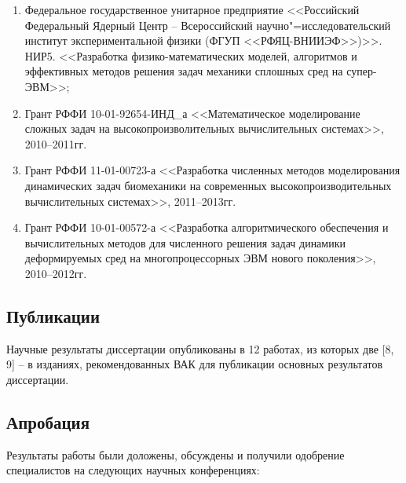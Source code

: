 \begin{enumerate}

\item Федеральное государственное унитарное предприятие <<Российский Федеральный Ядерный Центр -- Всероссийский научно"=исследовательский институт экспериментальной физики (ФГУП <<РФЯЦ-ВНИИЭФ>>)>>. НИР5. <<Разработка физико-математических моделей, алгоритмов и эффективных методов решения задач механики сплошных сред на супер-ЭВМ>>;

\item Грант РФФИ 10-01-92654-ИНД\_а <<Математическое моделирование сложных задач на высокопроизволительных вычислительных системах>>, 2010--2011гг.

\item Грант РФФИ 11-01-00723-а <<Разработка численных методов моделирования динамических задач биомеханики на современных высокопроизводительных вычислительных системах>>, 2011--2013гг.

\item Грант РФФИ 10-01-00572-а <<Разработка алгоритмического обеспечения и вычислительных методов для численного решения задач динамики деформируемых сред на многопроцессорных ЭВМ нового поколения>>, 2010--2012гг.

\end{enumerate}

\subsection*{Публикации}

Научные результаты диссертации опубликованы в 12 работах, из которых две [8, 9] -- в изданиях, рекомендованных ВАК для публикации основных результатов диссертации.

\subsection*{Апробация}

Результаты работы были доложены, обсуждены и получили одобрение специалистов на следующих научных конференциях:


